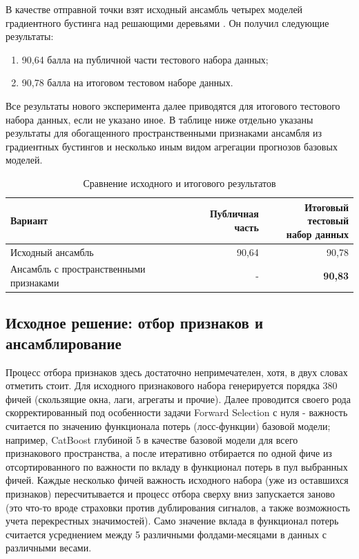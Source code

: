 \documentclass[12pt, a4paper]{article}
\newcommand{\tablesourcetext}[1]{\par\vspace{1mm}{\footnotesize Источник: #1.}}
\begin{document}
В качестве отправной точки взят исходный ансамбль четырех моделей градиентного бустинга над решающими деревьями \cite{friedman2001}.
Он получил следующие результаты:

\begin{enumerate}
    \item 90,64 балла на публичной части тестового набора данных;
    \item 90,78 балла на итоговом тестовом наборе данных.
\end{enumerate}

Все результаты нового эксперимента далее приводятся для итогового тестового набора данных, если не указано иное. В таблице
ниже отдельно указаны результаты для обогащенного пространственными признаками ансамбля из градиентных бустингов и несколько иным видом
агрегации прогнозов базовых моделей.

\begin{table}[H]
\centering
\footnotesize
\caption{Сравнение исходного и итогового результатов}
\begin{tabularx}{\textwidth}{Xrr}\toprule
Вариант & Публичная часть & \shortstack{Итоговый тестовый\\набор данных}\\\midrule
Исходный ансамбль & 90,64 & 90,78\\
Ансамбль с пространственными признаками & - & \textbf{90,83}\\\bottomrule
\end{tabularx}
\tablesourcetext{расчеты авторов по данным X5 Group}
\end{table}

\subsection*{Исходное решение: отбор признаков и ансамблирование}

Процесс отбора признаков здесь достаточно непримечателен, хотя, в двух словах отметить стоит.
Для исходного признакового набора генерируется порядка 380 фичей (скользящие окна, лаги, агрегаты и прочие).
Далее проводится своего рода скорректированный под особенности задачи Forward Selection с нуля - важность считается по
значению функционала потерь (лосс-функции) базовой модели; например, CatBoost глубиной 5 в качестве базовой модели для всего признакового пространства,
а после итеративно отбирается по одной фиче из отсортированного по важности по вкладу в функционал потерь в пул выбранных фичей.
Каждые несколько фичей важность исходного набора (уже из оставшихся признаков) пересчитывается и процесс отбора сверху вниз запускается заново
(это что-то вроде страховки против дублирования сигналов, а также возможность учета перекрестных значимостей).
Само значение вклада в функционал потерь считается усреднением между 5 различными фолдами-месяцами в данных с различными весами.
\end{document}
